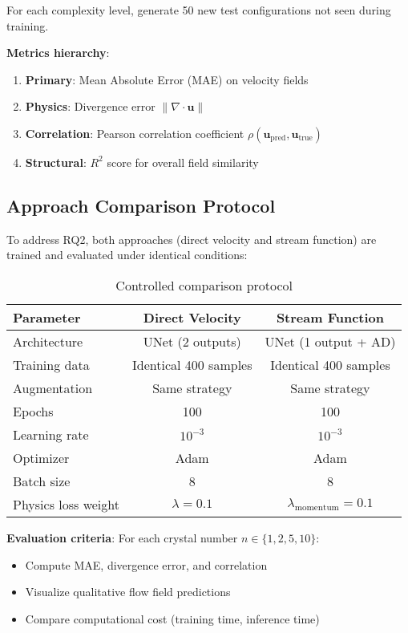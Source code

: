 For each complexity level, generate 50 new test configurations not seen during training.

\textbf{Metrics hierarchy}:
\begin{enumerate}
    \item \textbf{Primary}: Mean Absolute Error (MAE) on velocity fields
    \item \textbf{Physics}: Divergence error $\|\nabla \cdot \mathbf{u}\|$
    \item \textbf{Correlation}: Pearson correlation coefficient $\rho(\mathbf{u}_{\text{pred}}, \mathbf{u}_{\text{true}})$
    \item \textbf{Structural}: $R^2$ score for overall field similarity
\end{enumerate}

\subsection{Approach Comparison Protocol}

To address RQ2, both approaches (direct velocity and stream function) are trained and evaluated under identical conditions:

\begin{table}[htbp]
\centering
\caption{Controlled comparison protocol}
\label{tab:comparison_protocol}
\begin{tabular}{@{}lcc@{}}
\toprule
\textbf{Parameter} & \textbf{Direct Velocity} & \textbf{Stream Function} \\
\midrule
Architecture & UNet (2 outputs) & UNet (1 output + AD) \\
Training data & Identical 400 samples & Identical 400 samples \\
Augmentation & Same strategy & Same strategy \\
Epochs & 100 & 100 \\
Learning rate & $10^{-3}$ & $10^{-3}$ \\
Optimizer & Adam & Adam \\
Batch size & 8 & 8 \\
Physics loss weight & $\lambda = 0.1$ & $\lambda_{\text{momentum}} = 0.1$ \\
\bottomrule
\end{tabular}
\end{table}

\textbf{Evaluation criteria}: For each crystal number $n \in \{1, 2, 5, 10\}$:
\begin{itemize}
    \item Compute MAE, divergence error, and correlation
    \item Visualize qualitative flow field predictions
    \item Compare computational cost (training time, inference time)
\end{itemize}

